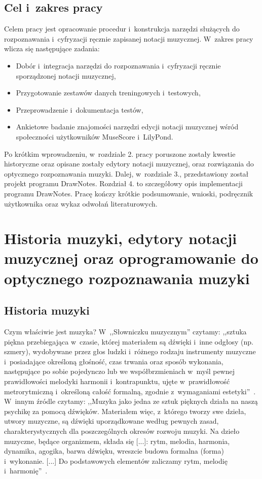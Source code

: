 \documentclass[polish,thesis,12pt]{dcsbook}
\begin{document}
\section{Cel i~zakres pracy}
Celem pracy jest opracowanie procedur i~konstrukcja narzędzi służących do rozpoznawania i~cyfryzacji ręcznie zapisanej notacji muzycznej.
W~zakres pracy wlicza się następujące zadania:

\begin{itemize}
  \item Dobór i~integracja narzędzi do rozpoznawania i~cyfryzacji ręcznie sporządzonej notacji muzycznej,
  \item Przygotowanie zestawów danych treningowych i~testowych,
  \item Przeprowadzenie i~dokumentacja testów,
  \item Ankietowe badanie znajomości narzędzi edycji notacji muzycznej wśród społeczności użytkowników MuseScore i~LilyPond.
\end{itemize}

Po krótkim wprowadzeniu, w~rozdziale 2. pracy poruszone zostały kwestie historyczne oraz opisane zostały edytory notacji muzycznej, oraz rozwiązania do optycznego rozpoznawania muzyki. Dalej, w~rozdziale 3., przedstawiony został projekt programu DrawNotes. Rozdział 4. to szczegółowy opis implementacji programu DrawNotes. Pracę kończy krótkie podsumowanie, wnioski, podręcznik użytkownika oraz wykaz odwołań literaturowych.

\chapter{Historia muzyki, edytory notacji muzycznej oraz oprogramowanie do optycznego rozpoznawania muzyki}
\section{Historia muzyki}
Czym właściwie jest muzyka? W~,,Słowniczku muzycznym'' czytamy: ,,sztuka piękna przebiegająca w~czasie, której materiałem są dźwięki i~inne odgłosy (np. szmery), wydobywane przez głos ludzki i~różnego rodzaju instrumenty muzyczne i~posiadające określoną głośność, czas trwania oraz sposób wykonania, następujące po sobie pojedynczo lub we współbrzmieniach w~myśl pewnej prawidłowości melodyki harmonii i~kontrapunktu, ujęte w~prawidłowość metrorytmiczną i~określoną całość formalną, zgodnie z~wymaganiami estetyki''~\cite{Slowniczek}. W~innym źródle czytamy: ,,Muzyka jako jedna ze sztuk pięknych działa na naszą psychikę za pomocą dźwięków. Materiałem więc, z~którego tworzy swe dzieła, utwory muzyczne, są dźwięki uporządkowane według pewnych zasad, charakterystycznych dla poszczególnych okresów rozwoju muzyki. Na dzieło muzyczne, będące organizmem, składa się [...]: rytm, melodia, harmonia, dynamika, agogika, barwa dźwięku, wreszcie budowa formalna (forma) i~wykonanie. [...] Do podstawowych elementów zaliczamy rytm, melodię i~harmonię''~\cite{PodstawoweWiadomosci}.
\end{document}
